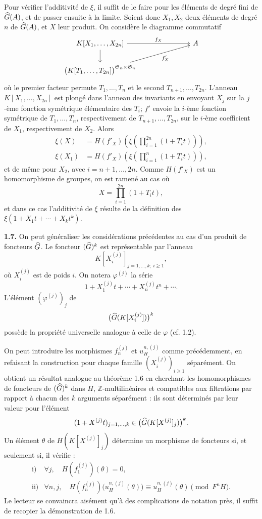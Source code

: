\documentclass[11pt]{article}
\begin{document}
Pour vérifier l'additivité de \(\xi\), il suffit de le faire pour les éléments de degré fini de \(\widehat G(A)\), et de passer ensuite à la limite. Soient donc \(X_1,X_2\) deux éléments de degré \(n\) de \(\widehat G(A)\), et \(X\) leur produit. On considère le diagramme commutatif
\[
\begin{tikzcd}[column sep=large]
K[X_1,\ldots,X_{2n}] \arrow[rr,"f_X"] \arrow[d] && A\\
\bigl(K[T_1,\ldots,T_{2n}]\bigr)^{\Sym_n\times\Sym_n}
\arrow[urr,"f'_X"'] &&
\end{tikzcd}
\]
où le premier facteur permute \(T_1,\ldots,T_n\) et le second \(T_{n+1},\ldots,T_{2n}\). L'anneau \(K[X_1,\ldots,X_{2n}]\) est plongé dans l'anneau des invariants en envoyant \(X_j\) sur la \(j\)-ème fonction symétrique élémentaire des \(T_i\); \(f'\) envoie la \(i\)-ème fonction symétrique de \(T_1,\ldots,T_n\), respectivement de \(T_{n+1},\ldots,T_{2n}\), sur le \(i\)-ème coefficient de \(X_1\), respectivement de \(X_2\). Alors
\[
\begin{aligned}
\xi(X)
&=H(f'_X)\left(\xi\left(\prod_{i=1}^{2n}(1+T_it)\right)\right),\\
\xi(X_1)
&=H(f'_X)\left(\xi\left(\prod_{i=1}^{n}(1+T_it)\right)\right),
\end{aligned}
\]
et de même pour \(X_2\), avec \(i=n+1,\ldots,2n\). Comme \(H(f'_X)\) est un homomorphisme de groupes, on est ramené au cas où
\[
  X=\prod_{i=1}^{2n}(1+T_it),
\]
et dans ce cas l'additivité de \(\xi\) résulte de la définition des \(\xi(1+X_1t+\cdots+X_k t^k)\).

\textbf{1.7.} On peut généraliser les considérations précédentes au cas d'un produit de foncteurs \(\widehat G\). Le foncteur \((\widehat G)^k\) est représentable par l'anneau
\[
  K[X_i^{(j)}]_{j=1,\ldots,k;\ i\geq 1},
\]
où \(X_i^{(j)}\) est de poids \(i\). On notera \(\varphi^{(j)}\) la série
\[
  1+X_1^{(j)}t+\cdots+X_n^{(j)}t^n+\cdots.
\]
L'élément \((\varphi^{(j)})_j\) de
\[
  \bigl(\widehat G(K[X_i^{(j)}])\bigr)^k
\]
possède la propriété universelle analogue à celle de \(\varphi\) (cf. 1.2).

On peut introduire les morphismes \(f_n^{(j)}\) et \(u_H^{n,(j)}\) comme précédemment, en refaisant la construction pour chaque famille \((X_i^{(j)})_{i\geq 1}\) séparément. On obtient un résultat analogue au théorème 1.6 en cherchant les homomorphismes de foncteurs de \((\widehat G)^k\) dans \(H\), \(\mathbb Z\)-multilinéaires et compatibles aux filtrations par rapport à chacun des \(k\) arguments séparément : ils sont déterminés par leur valeur pour l'élément
\[
  (1+X^{(j)}t)_{j=1,\ldots,k}
  \in\bigl(\widehat G(K[X^{(j)}]_j)\bigr)^k.
\]
Un élément \(\theta\) de \(H(K[X^{(j)}]_j)\) détermine un morphisme de foncteurs si, et seulement si, il vérifie :
\[
\begin{array}{ll}
\text{i)}& \forall j,\quad H(f_1^{(j)})(\theta)=0,\\[0.3em]
\text{ii)}& \forall n,j,\quad
H(f_n^{(j)})\bigl(u_H^{n,(j)}(\theta)\bigr)
\equiv u_H^{n,(j)}(\theta)\pmod{F^nH}.
\end{array}
\]
Le lecteur se convaincra aisément qu'à des complications de notation près, il suffit de recopier la démonstration de 1.6.
\end{document}

